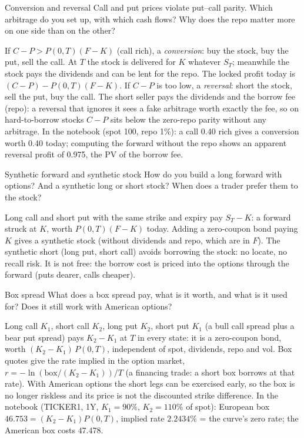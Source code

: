 \begin{question}{\Theory \Practice {}}{Conversion and reversal}
Call and put prices violate put--call parity. Which arbitrage do you set up, with which cash flows? Why does the repo
matter more on one side than on the other?
\end{question}
\begin{answer}
If $C - P > P(0,T)(F - K)$ (call rich), a \emph{conversion}: buy the stock, buy the put, sell the call. At $T$ the
stock is delivered for $K$ whatever $S_T$; meanwhile the stock pays the dividends and can be lent for the repo. The
locked profit today is $(C - P) - P(0,T)(F - K)$. If $C - P$ is too low, a \emph{reversal}: short the stock, sell the
put, buy the call. The short seller pays the dividends and the borrow fee (repo): a reversal that ignores it sees a
fake arbitrage worth exactly the fee, so on hard-to-borrow stocks $C - P$ sits below the zero-repo parity without any
arbitrage. In the notebook (spot 100, repo 1\%): a call 0.40 rich gives a conversion worth 0.40 today; computing the
forward without the repo shows an apparent reversal profit of 0.975, the PV of the borrow fee.
\end{answer}

\begin{question}{\Theory {}}{Synthetic forward and synthetic stock}
How do you build a long forward with options? And a synthetic long or short stock? When does a trader prefer them to
the stock?
\end{question}
\begin{answer}
Long call and short put with the same strike and expiry pay $S_T - K$: a forward struck at $K$, worth
$P(0,T)(F - K)$ today. Adding a zero-coupon bond paying $K$ gives a synthetic stock (without dividends and repo,
which are in $F$). The synthetic short (long put, short call) avoids borrowing the stock: no locate, no recall risk.
It is not free: the borrow cost is priced into the options through the forward (puts dearer, calls cheaper).
\end{answer}

\begin{question}{\Theory \Practice {}}{Box spread}
What does a box spread pay, what is it worth, and what is it used for? Does it still work with American options?
\end{question}
\begin{answer}
Long call $K_1$, short call $K_2$, long put $K_2$, short put $K_1$ (a bull call spread plus a bear put spread) pays
$K_2 - K_1$ at $T$ in every state: it is a zero-coupon bond, worth $(K_2 - K_1)\,P(0,T)$, independent of spot,
dividends, repo and vol. Box quotes give the rate implied in the option market, $r = -\ln(\text{box}/(K_2 - K_1))/T$
(a financing trade: a short box borrows at that rate). With American options the short legs can be exercised early,
so the box is no longer riskless and its price is not the discounted strike difference. In the notebook (TICKER1, 1Y,
$K_1 = 90\%$, $K_2 = 110\%$ of spot): European box $46.753 = (K_2 - K_1)P(0,T)$, implied rate $2.2434\%$ = the curve's
zero rate; the American box costs $47.478$.
\end{answer}

